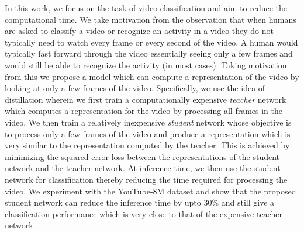 \documentclass[10pt,twocolumn,letterpaper]{article}
\begin{document}
In this work, we focus on the task of video classification \cite{Youtube8M} and aim to reduce the computational time. We take motivation from the observation that when humans are asked to classify a video or recognize an activity in a video they do not typically need to watch every frame or every second of the video. A human would typically fast forward through the video essentially seeing only a few frames and would still be able to recognize the activity (in most cases). Taking motivation from this we propose a model which can compute a representation of the video by looking at only a few frames of the video. Specifically, we use the idea of distillation wherein we first train a computationally expensive \textit{teacher} network which computes a representation for the video by processing all frames in the video. We then train a relatively inexpensive \textit{student} network whose objective is to process only a few frames of the video and produce a representation which is very similar to the representation computed by the teacher. This is achieved by minimizing the squared error loss between the representations of the student network and the teacher network. At inference time, we then use the student network for classification thereby reducing  the time required for processing the video. We experiment with the YouTube-8M dataset and show that the proposed student network can reduce the inference time by upto $30\%$ and still give a classification performance which is very close to that of the expensive teacher network. 
\end{document}
